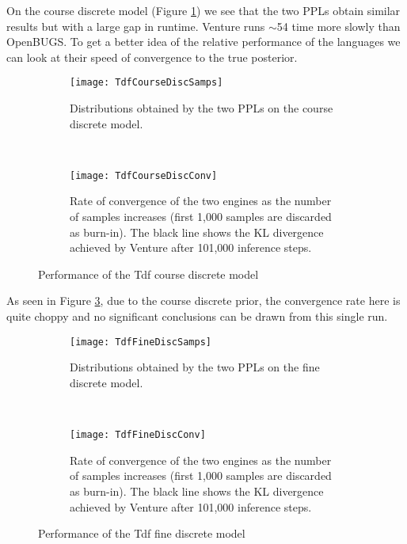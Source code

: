 On the course discrete model (Figure \ref{fig:tdfCourseDiscSamp}) we see that the two PPLs obtain similar results but with a large gap in runtime. Venture runs $\sim$54 time more slowly than OpenBUGS. To get a better idea of the relative performance of the languages we can look at their speed of convergence to the true posterior.

\begin{figure}[h]
    \centering
    \begin{subfigure}[t]{0.48\textwidth}
      \texttt{[image: TdfCourseDiscSamps]}
      \caption{Distributions obtained by the two PPLs on the course discrete model.}
      \label{fig:tdfCourseDiscSamp}
    \end{subfigure}
    ~
    \begin{subfigure}[t]{0.48\textwidth}
      \texttt{[image: TdfCourseDiscConv]}
      \caption{Rate of convergence of the two engines as the number of samples increases (first 1,000 samples are discarded as burn-in). The black line shows the KL divergence achieved by Venture after 101,000 inference steps.}
      \label{fig:tdfCourseDiscConv}
    \end{subfigure}
    \caption{Performance of the Tdf course discrete model}
\end{figure}

As seen in Figure \ref{fig:tdfCourseDiscConv}, due to the course discrete prior, the convergence rate here is quite choppy and no significant conclusions can be drawn from this single run. 

\begin{figure}[h]
    \centering
    \begin{subfigure}[t]{0.48\textwidth}
      \texttt{[image: TdfFineDiscSamps]}
      \caption{Distributions obtained by the two PPLs on the fine discrete model.}
      \label{fig:tdfFineDiscSamp}
    \end{subfigure}
    ~
    \begin{subfigure}[t]{0.48\textwidth}
      \texttt{[image: TdfFineDiscConv]}
      \caption{Rate of convergence of the two engines as the number of samples increases (first 1,000 samples are discarded as burn-in). The black line shows the KL divergence achieved by Venture after 101,000 inference steps.}
      \label{fig:tdfFineDiscConv}
    \end{subfigure}
    \caption{Performance of the Tdf fine discrete model}
\end{figure}

